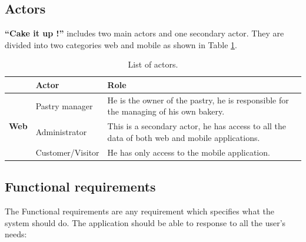 \documentclass[12pt,a4paper]{report}
\begin{document}
	\subsection{Actors}
	\textbf{``Cake it up !''} includes two main actors and one secondary actor. They are divided into two categories web and mobile as shown in Table \ref{table-actors}.
	\\
	\begin{table}[H]
		\begin{center}
			\caption{\label{table-actors} List of actors.} 
			\captionsetup[table]{skip=10pt}
			\setlength\doublerulesep{0.5pt}
			\begin{tabular}{|l|p{5cm}|p{8cm}| } 
				\hline
				\rowcolor{LightCyan}
				& \textbf{Actor}   & \textbf{Role}                                                                                 \\
				\hline
				\multirow{3}{*}{\textbf{Web} }
				
				& Pastry manager   & He is the owner of the pastry, he is responsible for the managing of his own bakery.          \\
				\cline{2-3}
				& Administrator    & This is a secondary actor, he has access to all the data of both web and mobile applications. \\
				\hline
				\textbf{Mobile} & Customer/Visitor & He has only access to the mobile application.                                                 \\
				
				\hline
			\end{tabular}
		\end{center}
		
	\end{table}
	
	\subsection{Functional requirements}
	The Functional requirements are any requirement which specifies what the system should do.
	The application should be able to response to all the user’s needs:
	
\end{document}
